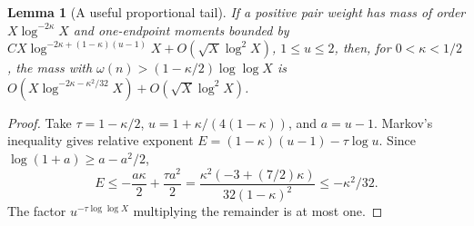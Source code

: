 \documentclass[11pt]{article}
\newtheorem{lemma}[theorem]{Lemma}
\theoremstyle{definition}
\theoremstyle{remark}
\numberwithin{equation}{section}
\begin{document}
\begin{lemma}[A useful proportional tail]\label{lem:chernoff}
If a positive pair weight has mass of order $X\log^{-2\kappa}X$ and one-endpoint moments bounded by
$CX\log^{-2\kappa+(1-\kappa)(u-1)}X+O(\sqrt X\log^2X)$, $1\le u\le2$, then, for $0<\kappa<1/2$,
the mass with $\omega(n)>(1-\kappa/2)\log\log X$ is
$O(X\log^{-2\kappa-\kappa^2/32}X)+O(\sqrt X\log^2X)$.
\end{lemma}
\begin{proof}
Take $\tau=1-\kappa/2$, $u=1+\kappa/(4(1-\kappa))$, and $a=u-1$.
Markov's inequality gives relative exponent $E=(1-\kappa)(u-1)-\tau\log u$.
Since $\log(1+a)\ge a-a^2/2$,
\begin{equation}\label{eq:chernoff-half}
 E\le-\frac{a\kappa}2+\frac{\tau a^2}2
 =\frac{\kappa^2(-3+(7/2)\kappa)}{32(1-\kappa)^2}
 \le-\kappa^2/32.
\end{equation}
The factor $u^{-\tau\log\log X}$ multiplying the remainder is at most one.
\end{proof}
\end{document}
